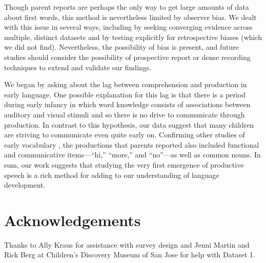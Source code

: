 \documentclass[10pt,letterpaper]{article}
\begin{document}
Though parent reports are perhaps the only way to get large amounts of data about first words, this method is nevertheless limited by observer bias. We dealt with this issue in several ways, including by seeking converging evidence across multiple, distinct datasets and by testing explicitly for retrospective biases (which we did not find). Nevertheless, the possibility of bias is present, and future studies should consider the possibility of prospective report or dense recording techniques to extend and validate our findings. 

We began by asking about the lag between comprehension and production in early language. One possible explanation for this lag is that there is a period during early infancy in which word knowledge consists of associations between auditory and visual stimuli and so there is no drive to communicate through production. In contrast to this hypothesis, our data suggest that many children are striving to communicate even quite early on. Confirming other studies of early vocabulary \cite{tardif2007}, the productions that parents reported also included functional and communicative items---``hi,'' ``more,'' and ``no''---as well as common nouns. In sum, our work suggests that studying the very first emergence of productive speech is a rich method for adding to our understanding of language development.

\section{Acknowledgements}

Thanks to Ally Kraus for assistance with survey design and Jenni Martin and Rick Berg at Children's Discovery Museum of San Jose for help with Dataset 1.



\setlength{\bibleftmargin}{.125in}
\setlength{\bibindent}{-\bibleftmargin}


\end{document}
